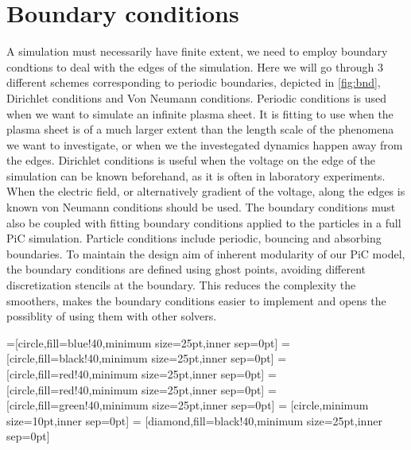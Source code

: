 \section{Boundary conditions}
	\label{sec:bnd_method}
	A simulation must necessarily have finite extent, we need to employ boundary condtions
	to deal with the edges of the simulation. Here we will go through \(3\) different schemes
	corresponding to periodic boundaries, depicted in \cref{fig:bnd}, Dirichlet conditions and Von Neumann conditions.
	Periodic conditions is used when we want to simulate an infinite plasma sheet.
	It is fitting to use when the plasma sheet is of a much larger extent than the
	length scale of the phenomena we want to investigate, or when we the investegated
	dynamics happen away from the edges.
	Dirichlet conditions is useful when the voltage on the edge of the simulation
	can be known beforehand, as it is often in laboratory experiments.
	When the electric field, or alternatively gradient of the voltage, along the edges is known
	von Neumann conditions should be used. The boundary conditions must also be coupled
	with fitting boundary conditions applied to the particles in a full PiC simulation.
	Particle conditions include periodic, bouncing and absorbing boundaries.
	To maintain the design aim of inherent modularity of our PiC model, the boundary conditions
	are defined using ghost points, avoiding different discretization stencils at
	the boundary. This reduces the complexity the smoothers, makes the boundary
	conditions easier to implement and opens the possiblity of using them with other
	solvers.

	=[circle,fill=blue!40,minimum size=25pt,inner sep=0pt]
	=[circle,fill=black!40,minimum size=25pt,inner sep=0pt]
	 = [circle,fill=red!40,minimum size=25pt,inner sep=0pt]
	 = [circle,fill=red!40,minimum size=25pt,inner sep=0pt]
	 = [circle,fill=green!40,minimum size=25pt,inner sep=0pt]
	 = [circle,minimum size=10pt,inner sep=0pt]
	 = [diamond,fill=black!40,minimum size=25pt,inner sep=0pt]

